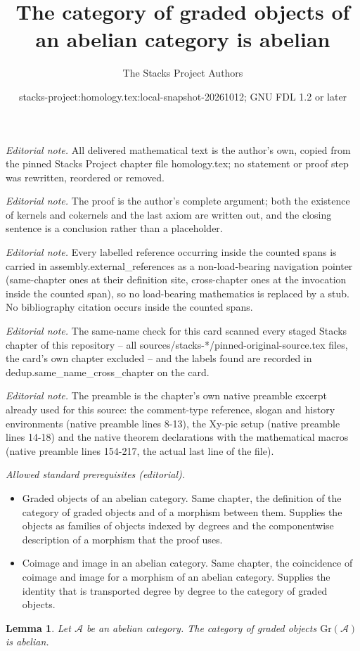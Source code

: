 \documentclass[10pt,a4paper]{amsart}
\title{The category of graded objects of an abelian category is abelian}
\author{The Stacks Project Authors}
\date{stacks-project:homology.tex:local-snapshot-20261012; GNU FDL 1.2 or later}
\theoremstyle{plain}
\newtheorem{lemma}[subsection]{Lemma}
\theoremstyle{definition}
\theoremstyle{remark}
\numberwithin{equation}{subsection}
\begin{document}
\maketitle
\noindent\textit{Editorial note.} All delivered mathematical text is the author's own, copied from the pinned Stacks Project chapter file homology.tex; no statement or proof step was rewritten, reordered or removed.\par\medskip
\noindent\textit{Editorial note.} The proof is the author's complete argument; both the existence of kernels and cokernels and the last axiom are written out, and the closing sentence is a conclusion rather than a placeholder.\par\medskip
\noindent\textit{Editorial note.} Every labelled reference occurring inside the counted spans is carried in assembly.external\_references as a non-load-bearing navigation pointer (same-chapter ones at their definition site, cross-chapter ones at the invocation inside the counted span), so no load-bearing mathematics is replaced by a stub. No bibliography citation occurs inside the counted spans.\par\medskip
\noindent\textit{Editorial note.} The same-name check for this card scanned every staged Stacks chapter of this repository -- all sources/stacks-*/pinned-original-source.tex files, the card's own chapter excluded -- and the labels found are recorded in dedup.same\_name\_cross\_chapter on the card.\par\medskip
\noindent\textit{Editorial note.} The preamble is the chapter's own native preamble excerpt already used for this source: the comment-type reference, slogan and history environments (native preamble lines 8-13), the Xy-pic setup (native preamble lines 14-18) and the native theorem declarations with the mathematical macros (native preamble lines 154-217, the actual last line of the file).\par\medskip
\noindent\textit{Allowed standard prerequisites (editorial).}\begin{itemize}
\item Graded objects of an abelian category. Same chapter, the definition of the category of graded objects and of a morphism between them. Supplies the objects as families of objects indexed by degrees and the componentwise description of a morphism that the proof uses.
\item Coimage and image in an abelian category. Same chapter, the coincidence of coimage and image for a morphism of an abelian category. Supplies the identity that is transported degree by degree to the category of graded objects.
\end{itemize}\medskip
\begin{lemma}
\label{lemma-graded}
Let $\mathcal{A}$ be an abelian category. The category of graded objects
$\text{Gr}(\mathcal{A})$ is abelian.
\end{lemma}
\end{document}

